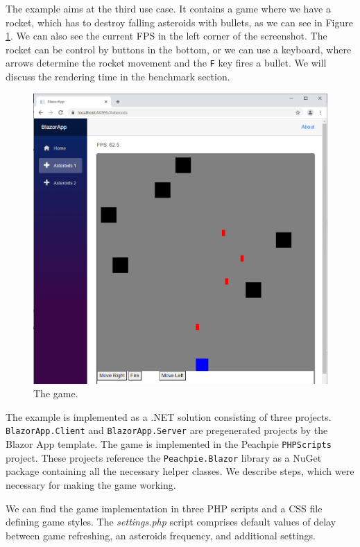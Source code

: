 The example aims at the third use case.
It contains a game where we have a rocket, which has to destroy falling asteroids with bullets, as we can see in Figure \ref{img28:game}.
We can also see the current \ac{FPS} in the left corner of the screenshot.
The rocket can be control by buttons in the bottom, or we can use a keyboard, where arrows determine the rocket movement and the \texttt{F} key fires a bullet.
We will discuss the rendering time in the benchmark section.
\par
\begin{figure}\centering
\includegraphics[scale=0.5]{./img/Asteroids}
\caption{The game.}
\label{img28:game}
\end{figure} 
\par
The example is implemented as a .NET solution consisting of three projects. 
\texttt{BlazorApp.Client} and \texttt{BlazorApp.Server} are pregenerated projects by the Blazor App template.
The game is implemented in the Peachpie \texttt{PHPScripts} project.
These projects reference the \texttt{Peachpie.Blazor} library as a NuGet package containing all the necessary helper classes. 
We describe steps, which were necessary for making the game working.
\par
We can find the game implementation in three PHP scripts and a CSS file defining game styles.
The \textit{settings.php} script comprises default values of delay between game refreshing, an asteroids frequency, and additional settings.
